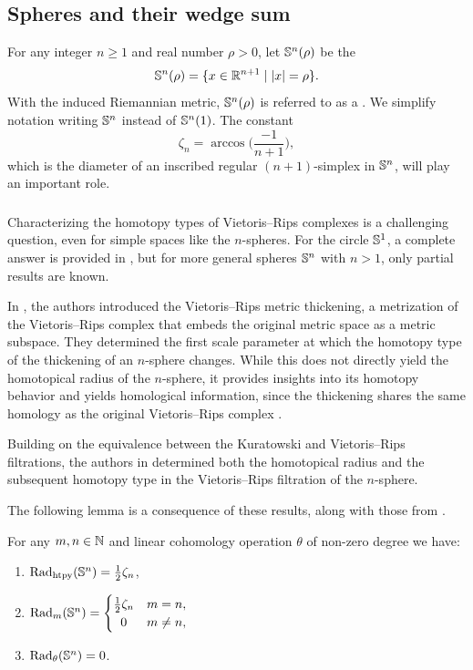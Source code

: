 
\subsection{Spheres and their wedge sum}\label{ss:Sn}

For any integer $n \geq 1$ and real number $\rho > 0$, let $\mathbb{S}^n(\rho)$ be the 
\[
\mathbb{S}^n(\rho) = \{x \in \mathbb{R}^{n+1} \mid \lvert x\rvert = \rho\}.
\]
With the induced Riemannian metric, \(\mathbb{S}^n(\rho)\) is referred to as a .
We simplify notation writing \(\mathbb{S}^n\) instead of \(\mathbb{S}^n(1)\).
The constant
\[
\zeta_n = \arccos\Big(\frac{-1}{n+1}\Big),
\]
which is the diameter of an inscribed regular $(n+1)$-simplex in $\mathbb{S}^n$, will play an important role.

\subsubsection{}\label{ss:critical values of Sn}

Characterizing the homotopy types of Vietoris--Rips complexes is a challenging question, even for simple spaces like the $n$-spheres.
For the circle $\mathbb{S}^1$, a complete answer is provided in \cite{adamaszek2017VietorisProduct}, but for more general spheres $\mathbb{S}^n$ with $n>1$, only partial results are known.

In \cite{adamaszek2018metric}, the authors introduced the Vietoris--Rips metric thickening, a metrization of the Vietoris--Rips complex that embeds the original metric space as a metric subspace. They determined the first scale parameter at which the homotopy type of the thickening of an \(n\)-sphere changes.
While this does not directly yield the homotopical radius of the \(n\)-sphere, it provides insights into its homotopy behavior and yields homological information, since the thickening shares the same homology as the original Vietoris–Rips complex \cite[Corollary~3]{gillespie2024vietoris}.

Building on the equivalence between the Kuratowski and Vietoris--Rips filtrations, the authors in \cite{lim2024vietoris} determined both the homotopical radius and the subsequent homotopy type in the Vietoris--Rips filtration of the \(n\)-sphere.

The following lemma is a consequence of these results, along with those from \cite{katz1983filling}.

\lemma
For any $m,n \in \mathbb{N}$ and linear cohomology operation $\theta$ of non-zero degree we have:
\begin{enumerate}
	\item \(\mathrm{Rad}_{\mathrm{htpy}}(\mathbb{S}^n) = \frac{1}{2}\zeta_n\),
	\item \(\firstdeath{m}{\bS^n} =
	\begin{cases}
		\frac{1}{2}\zeta_n & m = n, \\
		\hfil 0 & m \neq n,
	\end{cases}\)
	\item \(\mathrm{Rad}_{\theta}(\mathbb{S}^n) = 0\).
\end{enumerate}

